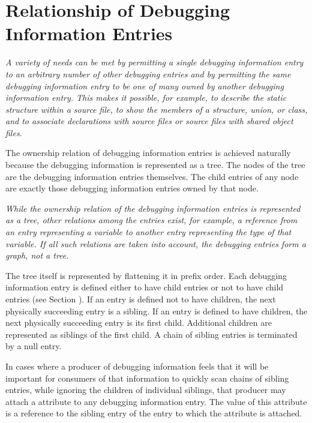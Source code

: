 \section{Relationship of Debugging Information Entries}
\label{chap:relationshipofdebugginginformationentries}
\textit{%
A variety of needs can be met by permitting a single
debugging information entry to  an arbitrary number
of other debugging entries and by permitting the same debugging
information entry to be one of many owned by another debugging
information entry. 
This makes it possible, for example, to
describe the static  structure 
within a source file,
to show the members of a structure, union, or class, and to
associate declarations with source files or source files
with shared object files.  
}


The ownership relation 
of debugging
information entries is achieved naturally because the debugging
information is represented as a tree. The nodes of the tree
are the debugging information entries themselves. 
The child entries of any node are exactly those debugging information
entries owned by that node.  

\textit{%
While the ownership relation
of the debugging information entries is represented as a
tree, other relations among the entries exist, for example,
a reference from an entry representing a variable to another
entry representing the type of that variable. 
If all such
relations are taken into account, the debugging entries
form a graph, not a tree.  
}

The tree itself is represented
by flattening it in prefix order. 
Each debugging information
entry is defined either to have child entries or not to have
child entries (see Section ). 
If an entry is defined not
to have children, the next physically succeeding entry is a
sibling. 
If an entry is defined to have children, the next
physically succeeding entry is its first child. 
Additional
children are represented as siblings of the first child. 
A chain of sibling entries is terminated by a null entry.

In cases where a producer of debugging information feels that
it\hypertarget{chap:DWATsiblingdebugginginformationentryrelationship}{}
will be important for consumers of that information to
quickly scan chains of sibling entries, while ignoring the
children of individual siblings, that producer may attach a
\DWATsiblingDEFN{} attribute 
to any debugging information entry. 
The value of this attribute is a reference to the sibling entry
of the entry to which the attribute is attached.

